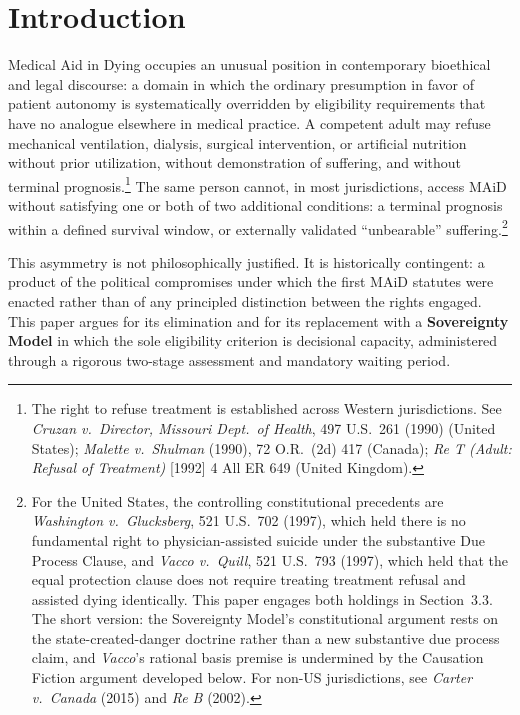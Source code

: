 \documentclass[11pt, letterpaper]{article}
\begin{document}
\bigskip

\section{Introduction}

Medical Aid in Dying occupies an unusual position in contemporary bioethical and legal
discourse: a domain in which the ordinary presumption in favor of patient autonomy is
systematically overridden by eligibility requirements that have no analogue elsewhere in
medical practice. A competent adult may refuse mechanical ventilation, dialysis, surgical
intervention, or artificial nutrition without prior utilization, without demonstration of
suffering, and without terminal prognosis.\footnote{%
  The right to refuse treatment is established across Western jurisdictions. See
  \textit{Cruzan v.\ Director, Missouri Dept.\ of Health}, 497 U.S.\ 261 (1990)
  (United States); \textit{Malette v.\ Shulman} (1990), 72 O.R.\ (2d) 417 (Canada);
  \textit{Re T (Adult: Refusal of Treatment)} [1992] 4 All ER 649 (United Kingdom).}
The same person cannot, in most jurisdictions, access MAiD without satisfying one or both
of two additional conditions: a terminal prognosis within a defined survival window, or
externally validated ``unbearable'' suffering.\footnote{%
  For the United States, the controlling constitutional precedents are
  \textit{Washington v.\ Glucksberg}, 521 U.S.\ 702 (1997), which held there is no
  fundamental right to physician-assisted suicide under the substantive Due Process Clause,
  and \textit{Vacco v.\ Quill}, 521 U.S.\ 793 (1997), which held that the equal protection
  clause does not require treating treatment refusal and assisted dying identically. This
  paper engages both holdings in Section~3.3. The short version: the Sovereignty Model's
  constitutional argument rests on the state-created-danger doctrine rather than a new
  substantive due process claim, and \textit{Vacco}'s rational basis premise is undermined
  by the Causation Fiction argument developed below. For non-US jurisdictions, see
  \textit{Carter v.\ Canada} (2015) and \textit{Re B} (2002).}

This asymmetry is not philosophically justified. It is historically contingent: a product
of the political compromises under which the first MAiD statutes were enacted rather than
of any principled distinction between the rights engaged. This paper argues for its
elimination and for its replacement with a \textbf{Sovereignty Model} in which the sole
eligibility criterion is decisional capacity, administered through a rigorous two-stage
assessment and mandatory waiting period.
\end{document}
